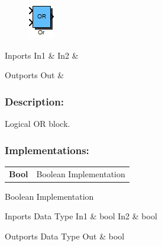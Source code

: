 \label{block:Or}
\begin{figure}[H]\includegraphics{Or}\end{figure} 

\begin{XtoCtabular}{Inports}
In1 & \tabularnewline
\hline
In2 & \tabularnewline
\hline
\end{XtoCtabular}


\begin{XtoCtabular}{Outports}
Out & \tabularnewline
\hline
\end{XtoCtabular}

\subsubsection*{Description:}
Logical OR block.

\subsubsection*{Implementations:}
\begin{tabular}{l l}
\textbf{Bool} & Boolean Implementation\tabularnewline
\end{tabular}

\nopagebreak[0]

Boolean Implementation

\begin{XtoCtabular}{Inports Data Type}
In1 & bool\tabularnewline
\hline
In2 & bool\tabularnewline
\hline
\end{XtoCtabular}

\begin{XtoCtabular}{Outports Data Type}
Out & bool\tabularnewline
\hline
\end{XtoCtabular}

\ifdefined \AddTestReports
{}
\fi
